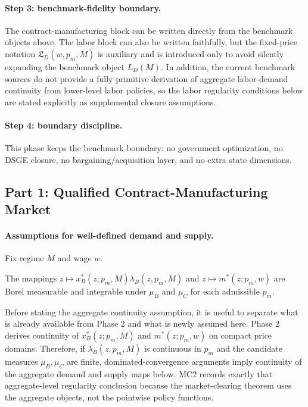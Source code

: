 \paragraph{Step 3: benchmark-fidelity boundary.}
The contract-manufacturing block can be written directly from the benchmark objects above. The labor block can also be written faithfully, but the fixed-price notation $\mathfrak L_D(w,p_m,M)$ is auxiliary and is introduced only to avoid silently expanding the benchmark object $L_D(M)$. In addition, the current benchmark sources do not provide a fully primitive derivation of aggregate labor-demand continuity from lower-level labor policies, so the labor regularity conditions below are stated explicitly as supplemental closure assumptions.

\paragraph{Step 4: boundary discipline.}
This phase keeps the benchmark boundary: no government optimization, no DSGE closure, no bargaining/acquisition layer, and no extra state dimensions.

\subsection{Part 1: Qualified Contract-Manufacturing Market}

\paragraph{Assumptions for well-defined demand and supply.}
Fix regime $M$ and wage $w$.
\begin{assumption}[MC1: Integrability]
The mappings $z\mapsto x_B^*(z;p_m,M)\lambda_B(z,p_m,M)$ and $z\mapsto m^*(z;p_m,w)$ are Borel measurable and integrable under $\mu_B$ and $\mu_C$ for each admissible $p_m$.
\end{assumption}

Before stating the aggregate continuity assumption, it is useful to separate what is already available from Phase 2 and what is newly assumed here. Phase 2 derives continuity of $x_B^*(z;p_m,M)$ and $m^*(z;p_m,w)$ on compact price domains. Therefore, if $\lambda_B(z,p_m,M)$ is continuous in $p_m$ and the candidate measures $\mu_B,\mu_C$ are finite, dominated-convergence arguments imply continuity of the aggregate demand and supply maps below. MC2 records exactly that aggregate-level regularity conclusion because the market-clearing theorem uses the aggregate objects, not the pointwise policy functions.

